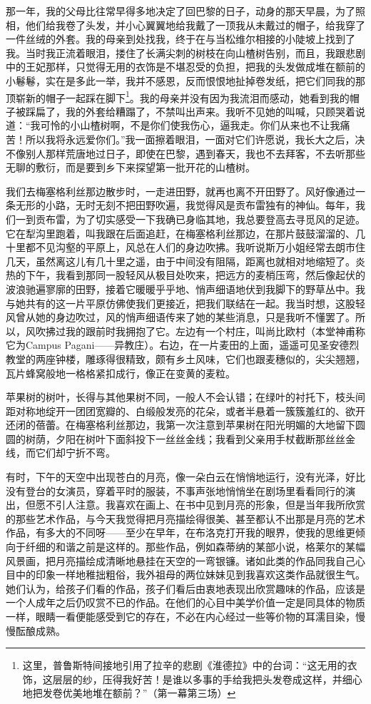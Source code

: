 \par 那一年，我的父母比往常早得多地决定了回巴黎的日子，动身的那天早晨，为了照相，他们给我卷了头发，并小心翼翼地给我戴了一顶我从未戴过的帽子，给我穿了一件丝绒的外套。我的母亲到处找我，终于在与当松维尔相接的小陡坡上找到了我。当时我正流着眼泪，搂住了长满尖刺的树枝在向山楂树告别，而且，我跟悲剧中的王妃那样，只觉得无用的衣饰是不堪忍受的负担，把我的头发做成堆在额前的小鬈鬈，实在是多此一举，我并不感恩，反而恨恨地扯掉卷发纸，把它们同我的那顶崭新的帽子一起踩在脚下\footnote{这里，普鲁斯特间接地引用了拉辛的悲剧《淮德拉》中的台词：“这无用的衣饰，这层层的纱，压得我好苦！是谁以多事的手给我把头发卷成这样，并细心地把发卷优美地堆在额前？”（第一幕第三场）}。我的母亲并没有因为我流泪而感动，她看到我的帽子被踩扁了，我的外套给糟蹋了，不禁叫出声来。我听不见她的叫喊，只顾哭着说道：“我可怜的小山楂树啊，不是你们使我伤心，逼我走。你们从来也不让我痛苦！所以我将永远爱你们。”我一面擦着眼泪，一面对它们许愿说，我长大之后，决不像别人那样荒唐地过日子，即使在巴黎，遇到春天，我也不去拜客，不去听那些无聊的敷衍，而是要到乡下来探望第一批开花的山楂树。
\par 我们去梅塞格利丝那边散步时，一走进田野，就再也离不开田野了。风好像通过一条无形的小路，无时无刻不把田野吹遍，我觉得风是贡布雷独有的神仙。每年，我们一到贡布雷，为了切实感受一下我确已身临其地，我总要登高去寻觅风的足迹。它在犁沟里跑着，叫我跟在后面追赶，在梅塞格利丝那边，在那片鼓鼓溜溜的、几十里都不见沟壑的平原上，风总在人们的身边吹拂。我听说斯万小姐经常去朗市住几天，虽然离这儿有几十里之遥，由于中间没有阻隔，距离也就相对地缩短了。炎热的下午，我看到那同一股轻风从极目处吹来，把远方的麦梢压弯，然后像起伏的波浪驰遍寥廓的田野，接着它暖暖乎乎地、悄声细语地伏到我脚下的野草丛中。我与她共有的这一片平原仿佛使我们更接近，把我们联结在一起。我当时想，这股轻风曾从她的身边吹过，风的悄声细语传来了她的某些消息，只是我听不懂罢了。所以，风吹拂过我的跟前时我拥抱了它。左边有一个村庄，叫尚比欧村（本堂神甫称它为Campus Pagani——异教庄）。右边，在一片麦田的上面，遥遥可见圣安德烈教堂的两座钟楼，雕琢得很精致，颇有乡土风味，它们也跟麦穗似的，尖尖翘翘，瓦片蜂窝般地一格格紧扣成行，像正在变黄的麦粒。
\par 苹果树的树叶，长得与其他果树不同，一般人不会认错；在绿叶的衬托下，枝头间距对称地绽开一团团宽瓣的、白缎般发亮的花朵，或者半悬着一簇簇羞红的、欲开还闭的蓓蕾。在梅塞格利丝那边，我第一次注意到苹果树在阳光明媚的大地留下圆圆的树荫，夕阳在树叶下面斜投下一丝丝金线；我看到父亲用手杖截断那丝丝金线，而它们却宁折不弯。
\par 有时，下午的天空中出现苍白的月亮，像一朵白云在悄悄地运行，没有光泽，好比没有登台的女演员，穿着平时的服装，不事声张地悄悄坐在剧场里看看同行的演出，但愿不引人注意。我喜欢在画上、在书中见到月亮的形象，但是当年我所欣赏的那些艺术作品，与今天我觉得把月亮描绘得很美、甚至都认不出那是月亮的艺术作品，有多大的不同呀——至少在早年，在布洛克打开我的眼界，使我的思维更倾向于纤细的和谐之前是这样的。那些作品，例如森蒂纳的某部小说，格莱尔的某幅风景画，把月亮描绘成清晰地悬挂在天空的一弯银镰。诸如此类的作品同我自己心目中的印象一样地稚拙粗俗，我外祖母的两位妹妹见到我喜欢这类作品就很生气。她们认为，给孩子们看的作品，孩子们看后由衷地表现出欣赏趣味的作品，应该是一个人成年之后仍叹赏不已的作品。在他们的心目中美学价值一定是同具体的物质一样，眼睛一看便能感受到它的存在，不必在内心经过一些等价物的耳濡目染，慢慢酝酿成熟。
